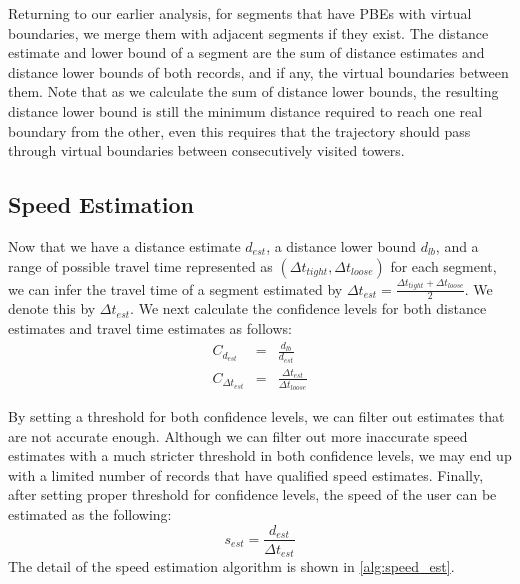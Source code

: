 Returning to our earlier analysis, for segments that have PBEs with virtual boundaries, we merge them with adjacent segments if they exist. The distance estimate and lower bound of a segment are the sum of distance estimates and distance lower bounds of both records, and if any, the virtual boundaries between them. Note that as we calculate the sum of distance lower bounds, the resulting distance lower bound is still the minimum distance required to reach one real boundary from the other, even this requires that the trajectory should pass through virtual boundaries  between consecutively visited towers.

\subsection{Speed Estimation}

Now that we have a distance estimate $d_{est}$, a distance lower bound $d_{lb}$, and a range of possible travel time represented as $(\Delta t_{tight}, \Delta t_{loose})$ for each segment, we can infer the travel time of a segment estimated by $\Delta t_{est} = \frac{\Delta t_{tight} + \Delta t_{loose}}{2}$. We denote this by $\Delta t_{est}$. We next calculate the confidence levels for both distance estimates and travel time estimates as follows:
\begin{eqnarray}
  C_{d_{est}} &=& \frac{d_{lb}}{d_{est}} \\
  C_{\Delta t_{est}} &=& \frac{\Delta t_{est}}{\Delta t_{loose}}
\end{eqnarray}

By setting a threshold for both confidence levels, we can filter out estimates that are not accurate enough. Although we can filter out more inaccurate speed estimates with a much stricter threshold in both confidence levels, we may end up with a limited number of records that have qualified speed estimates. Finally, after setting proper threshold for confidence levels, the speed of the user can be estimated as the following:
\begin{equation}
  s_{est} = \frac{d_{est}}{\Delta t_{est}}
\end{equation}
The detail of the speed estimation algorithm is shown in \autoref{alg:speed_est}.


